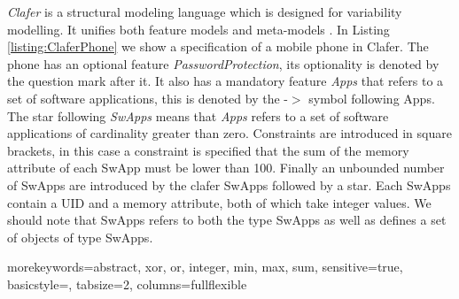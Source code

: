 \documentclass{article}
\begin{document}
\emph{Clafer} is a structural modeling language which is designed for variability modelling. It unifies both feature models  and meta-models \cite{BakClaferSLE2010}.
%
In Listing \ref{listing:ClaferPhone}  we show a specification of a mobile phone in Clafer. 
%
The phone has an optional feature \emph{PasswordProtection}, its optionality is denoted by the question mark after it. It also has a mandatory feature \emph{Apps} that refers  to a set of software applications, this is denoted by the  -$>$ symbol following  Apps. 
%
The star following  \emph{SwApps} means that \emph{Apps} refers to a set of software applications of cardinality greater than zero. 
%
Constraints are introduced in  square brackets, in this case a constraint is specified that the sum of the memory attribute of each SwApp must be lower than 100. 
%
Finally an unbounded number of SwApps are introduced by the clafer SwApps followed by a star. Each SwApps contain a UID and a memory attribute, both of which take integer values.  
%
We should note that SwApps refers to both the type SwApps as well as defines a set of objects of type SwApps.

{morekeywords={abstract, xor, or, integer, min, max, sum},
sensitive=true,
basicstyle={\sffamily\small},
tabsize=2,
columns=fullflexible
}
\end{document}
